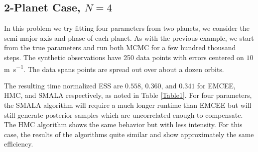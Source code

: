 \documentclass{aa}
\begin{document}
\begin{table}
\caption{MCMC Efficiency Results}             %
\label{Table1}      %
\centering                         
{}
\end{table}

\subsection{2-Planet Case, $N=4$}\label{n4section}

In this problem we try fitting four parameters from two planets, we consider the semi-major axis and phase of each planet. 
As with the previous example, we start from the true parameters and run both MCMC for a few hundred thousand steps. 
The synthetic observations have 250 data points with errors centered on $10$ \si{\metre\per\second}. 
The data spans points are spread out over about a dozen orbits.

The resulting time normalized ESS are $0.558$, $0.360$, and $0.341$ for EMCEE, HMC, and SMALA respectively, as noted in Table \ref{Table1}. 
For four parameters, the SMALA algorithm will require a much longer runtime than EMCEE but will still generate posterior samples which are uncorrelated enough to compensate. 
The HMC algorithm shows the same behavior but with less intensity. For this case, the results of the algorithms quite similar and show approximately the same efficiency.
\end{document}
